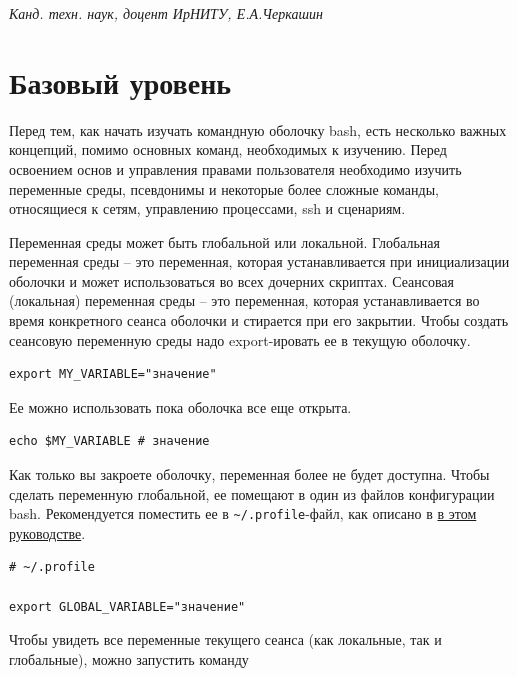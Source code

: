 \documentclass[12pt]{article}
\begin{document}
\vspace{3em}
\begin{flushright}\it
  Канд. техн. наук, доцент ИрНИТУ, Е.А.Черкашин
\end{flushright}

\clearpage

\hypertarget{Environment-variables}{%
\section{\texorpdfstring{\protect\hyperlink{Environment-variables}{}Базовый уровень}{Базовый уровень}}\label{Environment-variables}}

Перед тем, как начать изучать командную оболочку bash, есть несколько
важных концепций, помимо основных команд, необходимых к изучению. Перед
освоением основ и управления правами пользователя необходимо
изучить переменные среды, псевдонимы и некоторые более сложные команды,
относящиеся к сетям, управлению процессами, ssh и сценариям.

Переменная среды может быть глобальной или локальной. Глобальная
переменная среды -- это переменная, которая устанавливается при
инициализации оболочки и может использоваться во всех дочерних скриптах.
Сеансовая (локальная) переменная среды -- это переменная, которая
устанавливается во время конкретного сеанса оболочки и стирается при его
закрытии. Чтобы создать сеансовую переменную среды надо export-ировать
ее в текущую оболочку.

\begin{verbatim}
export MY_VARIABLE="значение"
\end{verbatim}

Ее можно использовать пока оболочка все еще открыта.

\begin{verbatim}
echo $MY_VARIABLE # значение
\end{verbatim}

Как только вы закроете оболочку, переменная более не будет доступна.
Чтобы сделать переменную глобальной, ее помещают в один из файлов
конфигурации bash. Рекомендуется поместить ее в
\texttt{\textasciitilde{}/.profile}-файл, как описано в
\href{blog/2019/user-permissions/}{в этом руководстве}.

\begin{verbatim}
# ~/.profile

export GLOBAL_VARIABLE="значение"
\end{verbatim}

Чтобы увидеть все переменные текущего сеанса (как локальные, так и
глобальные), можно запустить команду
\end{document}
